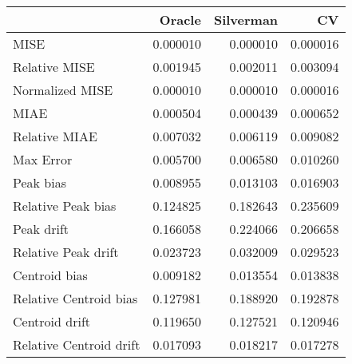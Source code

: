 \begin{tabular}{lrrr}
  \hline
 & Oracle & Silverman & CV \\ 
  \hline
MISE & 0.000010 & 0.000010 & 0.000016 \\ 
  Relative MISE & 0.001945 & 0.002011 & 0.003094 \\ 
  Normalized MISE & 0.000010 & 0.000010 & 0.000016 \\ 
  MIAE & 0.000504 & 0.000439 & 0.000652 \\ 
  Relative MIAE & 0.007032 & 0.006119 & 0.009082 \\ 
  Max Error & 0.005700 & 0.006580 & 0.010260 \\ 
  Peak bias & 0.008955 & 0.013103 & 0.016903 \\ 
  Relative Peak bias & 0.124825 & 0.182643 & 0.235609 \\ 
  Peak drift & 0.166058 & 0.224066 & 0.206658 \\ 
  Relative Peak drift & 0.023723 & 0.032009 & 0.029523 \\ 
  Centroid bias & 0.009182 & 0.013554 & 0.013838 \\ 
  Relative Centroid bias & 0.127981 & 0.188920 & 0.192878 \\ 
  Centroid drift & 0.119650 & 0.127521 & 0.120946 \\ 
  Relative Centroid drift & 0.017093 & 0.018217 & 0.017278 \\ 
   \hline
\end{tabular}

